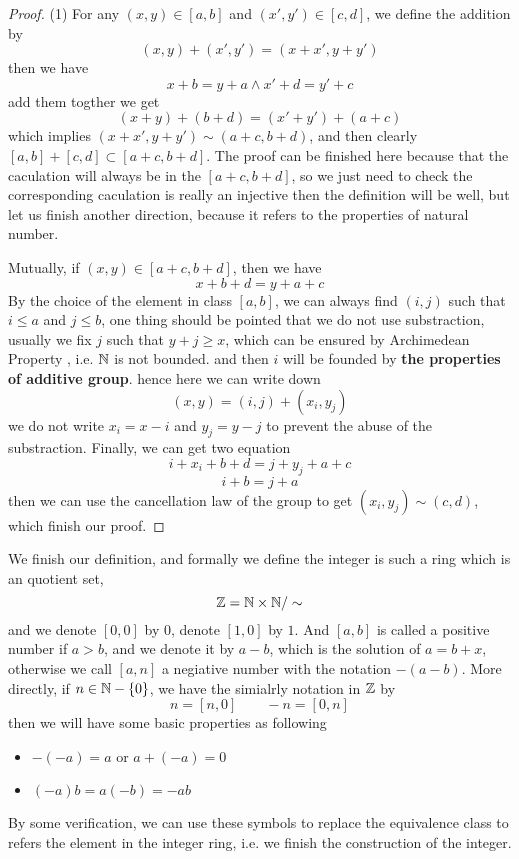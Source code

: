 \documentclass[en,geye,blue,normal,12pt]{elegantnote}
\begin{document}
\begin{proof}
  (1) For any \((x,y) \in [a,b]\) and \((x',y') \in [c,d]\), we define the addition by
  \[(x,y)+(x',y') = (x+x',y+y')\]
  then we have 
  \[x+b=y+a \wedge x'+d = y'+c\]
  add them togther we get 
  \[(x+y)+(b+d) = (x'+y')+(a+c)\]
  which implies \((x+x',y+y') \sim (a+c,b+d)\), and then clearly \([a,b]+[c,d] \subset [a+c,b+d]\). The proof can be finished here because that the caculation will always be in the \([a+c,b+d]\), so we just need to check the corresponding caculation is really an injective then the definition will be well, but let us finish another direction, because it refers to the properties of natural number.

  Mutually, if \((x,y)\in [a+c,b+d]\), then we have 
  \[x+b+d = y+a+c\] 
  By the choice of the element in class \([a,b]\), we can always find \((i,j)\) such that \(i\leq a\) and \(j \leq b\), one thing should be pointed that we do not use substraction, usually we fix \(j\) such that \(y+j \geq x\), which can be ensured by Archimedean Property , i.e. \(\mathbb{N}\) is not bounded. and then \(i\) will be founded by \textbf{the properties of additive group}. hence here we can write down \[(x,y) = (i,j) + (x_i,y_j)\]
  we do not write \(x_i =x-i\) and \(y_j = y-j\) to prevent the abuse of the substraction. Finally, we can get two equation
  \[i+x_i+b+d = j+y_j+a+c\]
  \[i+b = j+a\]
  then we can use the cancellation law of the group to get 
  \((x_i,y_j) \sim (c,d)\), which finish our proof.
\end{proof}

\begin{remark}
  We finish our definition, and formally we define the integer is such a ring which is an quotient set,
  \[\mathbb{Z} = \mathbb{N} \times \mathbb{N} / \sim\]
  and we denote \([0,0]\) by \(0\), denote \([1,0]\) by \(1\). And \([a,b]\) is called a positive number if \(a>b\), and we denote it by \(a-b\), which is the solution of \(a=b+x\), otherwise we call \([a,n]\) a negiative number with the notation \(-(a-b)\). More directly, if \(n \in \mathbb{N} - \{0\}\), we have the simialrly notation in \(\mathbb{Z}\) by 
  \[ n = [n,0] \qquad -n = [0,n]\]
  then we will have some basic properties as following
  \begin{itemize}
    \item \(-(-a) = a\) or \(a+(-a)=0\)
    \item \((-a)b = a(-b) = -ab\)
  \end{itemize}
  By some verification, we can use these symbols to replace the equivalence class to refers the element in the integer ring, i.e. we finish the construction of the integer.

\end{remark}
\end{document}
